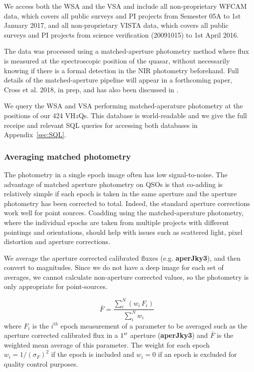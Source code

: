 \documentclass[usenatbib]{mnras}
\begin{document}
We access both the WSA and the VSA and include all non-proprietary WFCAM data, which covers all
public surveys and PI projects from Semester 05A to 1st January 2017, and all
non-proprietary VISTA data, which covers all public surveys and PI projects from
science verification (20091015) to 1st April 2016. 

The data was processed using a matched-aperture photometry method
where flux is measured at the spectroscopic position of the quasar,
without necessarily knowing if there is a formal detection in the NIR
photometry beforehand.  Full details of the matched-aperture pipeline
will appear in a forthcoming paper, Cross et al.  2018, in prep, and
has also been discussed in \citet{Cross2013}.  

We query the WSA and VSA performing matched-aperature photometry at
the positions of our 424 VH$z$Qs. This database is world-readable and we give the full receipe
and relevant SQL queries for accessing both databases in Appendix~\ref{sec:SQL}.
   
    \subsubsection{Averaging matched photometry}
    The photometry in a single epoch image often has low
    signal-to-noise.  The advantage of matched aperture photometry on QSOs
    is that co-adding is relatively simple if each epoch is taken in the
    same aperture and the aperture photometry has been corrected to
    total. Indeed, the standard aperture corrections work well for point
    sources. Coadding using the matched-aperature photometry, where the
    individual epochs are taken from multiple projects with different
    pointings and orientations, should help with issues such as scattered
    light, pixel distortion and aperture corrections.
    
    We average the aperture corrected calibrated fluxes (e.g. {\bf aperJky3}), and
    then convert to magnitudes. Since we do not have a deep image for
    each set of averages, we cannot calculate non-aperture corrected values, so the
    photometry is only appropriate for point-sources. 

    \begin{equation}
      \bar{F} = \frac{\sum_i^N (w_i\,F_i)}{\sum_i^N w_i}  
      \label{eq:avg}
    \end{equation}
    where $F_i$ is the $i^{th}$ epoch measurement of a parameter to be
    averaged such as the aperture corrected calibrated flux in a $1\hbox{$^{\prime\prime}$}$ aperture
    ({\bf aperJky3}) and $\bar{F}$ is the weighted mean average of this parameter.
    The weight for each epoch $w_i=1/(\sigma_{F})^2$ if the epoch is included and 
    $w_i=0$ if an epoch is excluded for quality control purposes. 
    
\end{document}
